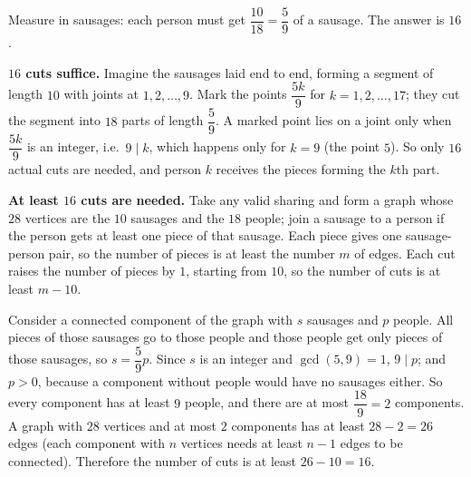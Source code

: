 Measure in sausages: each person must get $\dfrac{10}{18}=\dfrac{5}{9}$ of a sausage. The answer is $\boxed{16}$.

\textbf{$16$ cuts suffice.} Imagine the sausages laid end to end, forming a segment of length $10$ with joints at $1,2,\dots,9$. Mark the points $\dfrac{5k}{9}$ for $k=1,2,\dots,17$; they cut the segment into $18$ parts of length $\dfrac{5}{9}$. A marked point lies on a joint only when $\dfrac{5k}{9}$ is an integer, i.e.\ $9\mid k$, which happens only for $k=9$ (the point $5$). So only $16$ actual cuts are needed, and person $k$ receives the pieces forming the $k$th part.

\textbf{At least $16$ cuts are needed.} Take any valid sharing and form a graph whose $28$ vertices are the $10$ sausages and the $18$ people; join a sausage to a person if the person gets at least one piece of that sausage. Each piece gives one sausage-person pair, so the number of pieces is at least the number $m$ of edges. Each cut raises the number of pieces by $1$, starting from $10$, so the number of cuts is at least $m-10$.

Consider a connected component of the graph with $s$ sausages and $p$ people. All pieces of those sausages go to those people and those people get only pieces of those sausages, so $s=\dfrac{5}{9}p$. Since $s$ is an integer and $\gcd(5,9)=1$, $9\mid p$; and $p>0$, because a component without people would have no sausages either. So every component has at least $9$ people, and there are at most $\dfrac{18}{9}=2$ components. A graph with $28$ vertices and at most $2$ components has at least $28-2=26$ edges (each component with $n$ vertices needs at least $n-1$ edges to be connected). Therefore the number of cuts is at least $26-10=16$.
